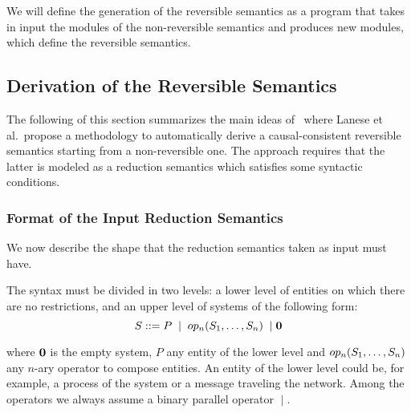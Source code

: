 \documentclass{article}[12pt,a4paper]
\theoremstyle{definition}
\newcommand{\paral}{\;|\;}
\begin{document}
We will define the generation of the reversible semantics as a program
that takes in input the modules of the non-reversible semantics and
produces new modules, which define the reversible semantics.

\subsection{Derivation of the Reversible Semantics}\label{sec:gener-appr-derive-rev-sem}


The following of this section summarizes the main ideas of~\cite{LaneseM20}
where Lanese et al.\ propose a methodology to automatically
derive a causal-consistent reversible semantics starting from a non-reversible one. The approach requires that
the latter is modeled as a reduction semantics which satisfies some syntactic conditions.

\subsubsection{Format of the Input Reduction Semantics}

We now describe the shape that the reduction semantics taken as input
must have.

The syntax must be divided in two levels: a lower level of entities on which there are no restrictions, and an upper level of systems of the following
form:
\[
  S::=P\;\paral \;\op(S_1,\ldots,S_n)\; \paral \nil
\]

where ${\bf{0}}$ is the empty system, $P$ any entity of the lower level and $op_n(S_1,\ldots,S_n)$ any $n$-ary operator to
compose entities. An entity of the lower level could be, for example, a process of the system or
a message traveling the network. Among the operators we always assume a binary parallel operator $\paral$.
\end{document}
